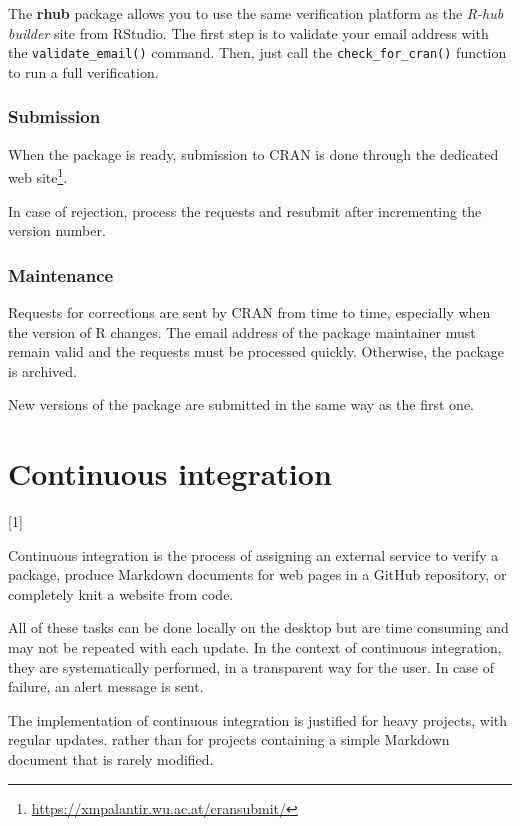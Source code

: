 \documentclass[
  12pt,
  american,
  a4paper,
  extrafontsizes,onecolumn,openright
  ]{memoir}
\newlength{\rf}
\newcommand{\toc}[1]{%
  \startcontents[chapters]%
  \printcontents[chapters]{}{1}[#1]{}%
  ~\newline%
}
\begin{document}
The \textbf{rhub} package allows you to use the same verification platform as the \emph{R-hub builder} site from RStudio.
The first step is to validate your email address with the \texttt{validate\_email()} command.
Then, just call the \texttt{check\_for\_cran()} function to run a full verification.

\hypertarget{submission}{%
\subsection{Submission}\label{submission}}

When the package is ready, submission to CRAN is done through the dedicated web site\footnote{\url{https://xmpalantir.wu.ac.at/cransubmit/}}.

In case of rejection, process the requests and resubmit after incrementing the version number.

\hypertarget{maintenance}{%
\subsection{Maintenance}\label{maintenance}}

Requests for corrections are sent by CRAN from time to time, especially when the version of R changes.
The email address of the package maintainer must remain valid and the requests must be processed quickly.
Otherwise, the package is archived.

New versions of the package are submitted in the same way as the first one.

\hypertarget{chap-ci}{%
\chapter{Continuous integration}\label{chap-ci}}

\toc{1}

Continuous integration is the process of assigning an external service to verify a package, produce Markdown documents for web pages in a GitHub repository, or completely knit a website from code.

All of these tasks can be done locally on the desktop but are time consuming and may not be repeated with each update.
In the context of continuous integration, they are systematically performed, in a transparent way for the user.
In case of failure, an alert message is sent.

The implementation of continuous integration is justified for heavy projects, with regular updates.
rather than for projects containing a simple Markdown document that is rarely modified.
\end{document}
